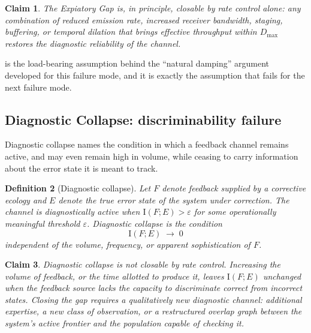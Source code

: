 \documentclass[12pt]{report}
\newtheorem{definition}{Definition}[section]
\newtheorem{claim}[definition]{Claim}
\newcommand{\I}{\ensuremath{\mathrm{I}}}
\begin{document}
\begin{claim}
\label{claim:expiatory-remedy}
The Expiatory Gap is, in principle, closable by rate control alone: any
combination of reduced emission rate, increased receiver bandwidth,
staging, buffering, or temporal dilation that brings effective throughput
within $D_{\max}$ restores the diagnostic reliability of the channel.
\end{claim}

 is the load-bearing assumption behind the
``natural damping'' argument developed for this failure mode, and it is
exactly the assumption that fails for the next failure mode.

\subsection{Diagnostic Collapse: discriminability failure}
\label{subsec:diagnostic-collapse}

Diagnostic collapse names the condition in which a feedback channel
remains active, and may even remain high in volume, while ceasing to
carry information about the error state it is meant to track.

\begin{definition}[Diagnostic collapse]
Let $F$ denote feedback supplied by a corrective ecology and $E$ denote
the true error state of the system under correction. The channel is
diagnostically active when $\I(F;E) > \varepsilon$ for some operationally
meaningful threshold $\varepsilon$. Diagnostic collapse is the condition
\[
\I(F;E) \;\longrightarrow\; 0
\]
independent of the volume, frequency, or apparent sophistication of $F$.
\end{definition}

\begin{claim}
\label{claim:diagnostic-remedy}
Diagnostic collapse is not closable by rate control. Increasing the
volume of feedback, or the time allotted to produce it, leaves
$\I(F;E)$ unchanged when the feedback source lacks the capacity to
discriminate correct from incorrect states. Closing the gap requires a
qualitatively new diagnostic channel: additional expertise, a new class of
observation, or a restructured overlap graph between the system's active
frontier and the population capable of checking it.
\end{claim}
\end{document}
